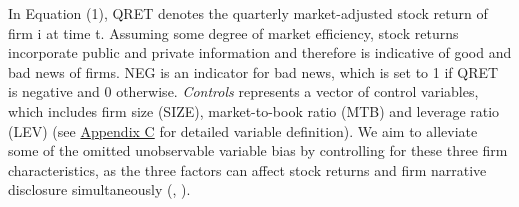 \documentclass[a4paper]{article}
\begin{document}
\begin{spacing}{2}
In Equation (1), QRET denotes the quarterly market-adjusted stock return of firm i at time t. Assuming some degree of market efficiency, stock returns incorporate public and private information and therefore is indicative of good and bad news of firms. %
NEG is an indicator for bad news, which is set to 1 if QRET is negative and 0 otherwise. \textit{Controls} represents a vector of control variables, which includes firm size (SIZE), market-to-book ratio (MTB) and leverage ratio (LEV) (see \hyperref[appc]{Appendix C} for detailed variable definition). We aim to alleviate some of the omitted unobservable variable bias by controlling for these three firm characteristics, as the three factors can affect stock returns and firm narrative disclosure simultaneously (\cite{liInformationContentForwardLooking2010}, \cite{huangToneManagement2014}). %

\end{spacing}
\end{document}
